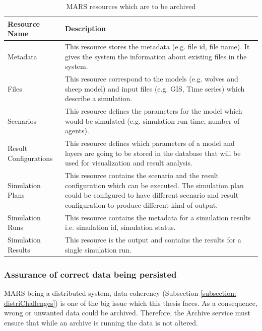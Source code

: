         \begin{table}[H]
            \centering
            \begin{tabular}{|p{3cm}|p{12cm}|}
                \hline
                    \textbf{Resource Name}  & \textbf{Description}\\
                \hline
                     Metadata & 
                     This resource stores the metadata (e.g. file id, file name). It gives the system the information about
                     existing files in the system. \\
                \hline
                     Files & 
                     This resource correspond to the models (e.g. wolves and sheep model) and input files (e.g. GIS, Time series) which describe a simulation. \\
                \hline
                     Scenarios & 
                     This resource defines the parameters for the model which would be simulated (e.g. simulation run time, number of agents). \\
                \hline
                     Result Configurations & 
                     This resource defines which parameters of a model and layers are going to be stored in the database that will be used for visualization
                     and result analysis.\\
                \hline
                     Simulation Plans & 
                     This resource contains the scenario and the result configuration which can be executed. The simulation plan could be configured to
                     have different scenario and result configuration to produce different kind of output.\\
                \hline
                     Simulation Runs & 
                     This resource contains the metadata for a simulation results i.e. simulation id, simulation status.\\
                \hline
                     Simulation Results & 
                     This resource is the output and contains the results for a single simulation run.\\
                \hline
            \end{tabular}
            \caption{MARS resources which are to be archived}
            \label{table: archivedMars}     
        \end{table} 
        
        \subsubsection{Assurance of correct data being persisted}
            MARS being a distributed system, data coherency (Subsection \ref{subsection: distriChallenges}) 
            is one of the big issue which this thesis faces. As a consequence,
            wrong or unwanted data could be archived. Therefore, the Archive service must ensure that while an archive is running the data is not
            altered.
        
